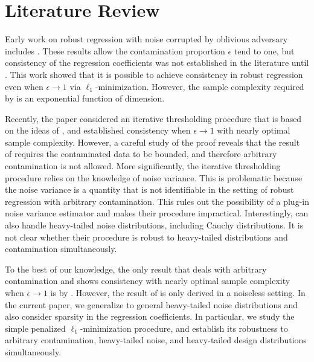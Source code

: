 
\section{Literature Review}

Early work on robust regression with noise corrupted by oblivious adversary includes \cite{wright2010dense,nguyen2013exact,nguyen2012robust}. These results allow the contamination proportion $\epsilon$ tend to one, but consistency of the regression coefficients was not established in the literature until \cite{tsakonas2014convergence}. This work showed that it is possible to achieve consistency in robust regression even when $\epsilon\rightarrow 1$ via $\ell_1$-minimization. However, the sample complexity required by \cite{tsakonas2014convergence} is an exponential function of dimension.

Recently, the paper \cite{suggala2019adaptive} considered an iterative thresholding procedure that is based on the ideas of \cite{jain2014iterative,bhatia2017consistent}, and established consistency when $\epsilon\rightarrow 1$ with nearly optimal sample complexity. However, a careful study of the proof reveals that the result of \cite{suggala2019adaptive} requires the contaminated data to be bounded, and therefore arbitrary contamination is not allowed. More significantly, the iterative thresholding procedure relies on the knowledge of noise variance. This is problematic because the noise variance is a quantity that is not identifiable in the setting of robust regression with arbitrary contamination. This rules out the possibility of a plug-in noise variance estimator and makes their procedure impractical. Interestingly, \cite{suggala2019adaptive} can also handle heavy-tailed noise distributions, including Cauchy distributions. It is not clear whether their procedure is robust to heavy-tailed distributions and contamination simultaneously.

To the best of our knowledge, the only result that deals with arbitrary contamination and shows consistency with nearly optimal sample complexity when $\epsilon\rightarrow 1$ is by \cite{gao2020model}. However, the result of \cite{gao2020model} is only derived in a noiseless setting. In the current paper, we generalize \cite{gao2020model} to general heavy-tailed noise distributions and also consider sparsity in the regression coefficients. In particular, we study  the simple penalized $\ell_1$-minimization procedure, and establish its robustness to arbitrary contamination, heavy-tailed noise, and heavy-tailed design distributions simultaneously.

